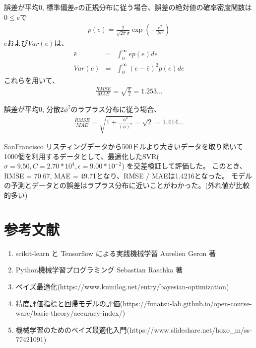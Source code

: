 \documentclass{jsarticle}
\begin{document}
誤差が平均0, 標準偏差$\sigma$の正規分布に従う場合、誤差の絶対値の確率密度関数は$0 \leq e$で
\begin{eqnarray*}
    p(e) = \frac{2}{\sqrt{2\pi} \sigma} \exp (-\frac{e^2}{2 \sigma^2})
\end{eqnarray*}
$\bar{e}$および$Var(e)$は、
\begin{eqnarray*}
    \bar{e} &=& \int_0^{\infty} e p(e) de \\
    Var(e) &=& \int_0^{\infty} (e - \bar{e})^2 p(e) de
\end{eqnarray*}
これらを用いて、
\begin{eqnarray*}
    \frac{RMSE}{MAE} = \sqrt{\frac{\pi}{2}} = 1.253...
\end{eqnarray*}

誤差が平均0, 分散$2\phi^2$のラプラス分布に従う場合、
\begin{eqnarray*}
    \frac{RMSE}{MAE} = \sqrt{1 + \frac{\phi^2}{(\phi)^2}} = \sqrt{2} = 1.414...
\end{eqnarray*}

SanFrancisco リスティングデータから500ドルより大きいデータを取り除いて
1000個を利用するデータとして、最適化したSVR($\sigma = 9.50, C = 2.70 * 10^4, \epsilon = 9.00 * 10^{-2}$)
を交差検証して評価した。
このとき、RMSE = 70.67, MAE = 49.71となり、RMSE / MAEは1.4216となった。
モデルの予測とデータとの誤差はラプラス分布に近いことがわかった。(外れ値が比較的多い)

\section{参考文献}
\begin{enumerate}
    \item scikit-learn と Tensorflow による実践機械学習 Aurelien Geron 著
    \item Python機械学習プログラミング Sebastian Raschka 著
    \item ベイズ最適化(https://www.kumilog.net/entry/bayesian-optimization)
    \item 精度評価指標と回帰モデルの評価(https://funatsu-lab.github.io/open-course-ware/basic-theory/accuracy-index/)
    \item 機械学習のためのベイズ最適化入門(https://www.slideshare.net/hoxo\_m/ss-77421091)
\end{enumerate}
\end{document}
